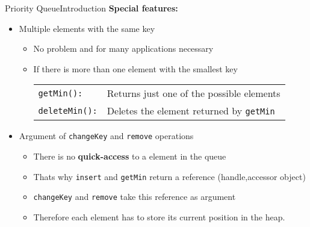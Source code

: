 
\begin{frame}{Priority Queue}{Introduction}
  \textbf{Special features:}
  \begin{itemize}
    \item<2->
      Multiple elements with the same key
      \begin{itemize}
        \item<3->
          No problem and for many applications necessary
        \item<3->
          If there is more than one element with the smallest key
          \begin{tabular}{ll}
            {\color{Mittel-Blau}\texttt{getMin():}} &
            Returns just one of the possible elements\\
            {\color{Mittel-Blau}\texttt{deleteMin():}} &
            Deletes the element returned by
            {\color{Mittel-Blau}\texttt{getMin}}
          \end{tabular}
      \end{itemize}
      \vspace{0.5em}
    \item<4->
      Argument of {\color{Mittel-Blau}\texttt{changeKey}} and
          {\color{Mittel-Blau}\texttt{remove}} operations
      \begin{itemize}
        \item<5->
          There is no \textbf{quick-access} to a element in the queue
        \item<5->
          Thats why {\color{Mittel-Blau}\texttt{insert}} and
          {\color{Mittel-Blau}\texttt{getMin}} return a reference (handle,accessor object)
        \item<5->
          {\color{Mittel-Blau}\texttt{changeKey}} and
          {\color{Mittel-Blau}\texttt{remove}} take this reference as argument
        \item<5->
          Therefore each element has to store its current position in the heap.
      \end{itemize}
  \end{itemize}
\end{frame}



